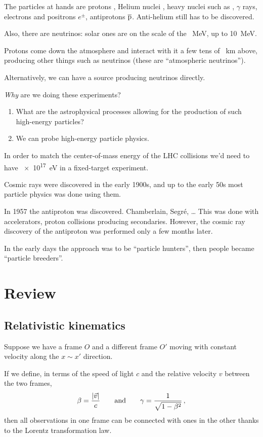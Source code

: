 \documentclass[main.tex]{subfiles}
\begin{document}
The particles at hands are protons , Helium nuclei , heavy nuclei such as , \(\gamma \) rays, electrons and positrons \(e^{\pm}\), antiprotons \(\ce{\overline{p}}\). 
Anti-helium still has to be discovered. 

Also, there are neutrinos: solar ones are on the scale of the \SI{}{MeV}, up to \SI{10}{MeV}. 

Protons come down the atmosphere and interact with it a few tens of \SI{}{km} above, producing other things such as neutrinos (these are ``atmospheric neutrinos''). 

Alternatively, we can have a source producing neutrinos directly. 

\emph{Why} are we doing these experiments?
\begin{enumerate}
    \item What are the astrophysical processes allowing for the production of such high-energy particles?
    \item We can probe high-energy particle physics. 
\end{enumerate}

In order to match the center-of-mass energy of the LHC collisions we'd need to have \SI{e17}{eV} in a fixed-target experiment. 

Cosmic rays were discovered in the early 1900s, and up to the early 50s most particle physics was done using them.

In 1957 the antiproton was discovered.
Chamberlain, Segré, \dots
This was done with accelerators, proton collisions producing secondaries. 
However, the cosmic ray discovery of the antiproton was performed only a few months later. 

In the early days the approach was to be ``particle 
hunters'', then people became ``particle breeders''. 

\section{Review}

\subsection{Relativistic kinematics}

Suppose we have a frame \(O\) and a different frame \(O'\) moving with constant velocity along the \(x \sim x'\) direction. 

If we define, in terms of the speed of light \(c\) and the relative velocity \(v\) between the two frames,
%
\begin{align}
\beta  = \frac{\abs{\vec{v}}}{c} \qquad \text{and} \qquad
\gamma = \frac{1}{\sqrt{1 - \beta^2}}
\,,
\end{align}
%
then all observations in one frame can be connected with ones in the other thanks to the Lorentz transformation law. 
\end{document}
